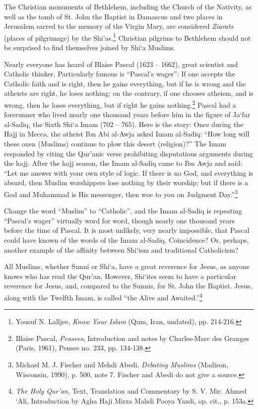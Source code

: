 The Christian monuments of Bethlehem, including the Church of the Nativity, as well as the tomb of St. John the Baptist in Damascus and two places in Jerusalem sacred to the memory of the Virgin Mary, are considered \emph{Ziarats} (places of pilgrimage) by the Shi'as.\footnote{Yousuf N. Lalljee, \emph{Know Your Islam} (Qum, Iran, undated), pp. 214-216.} Christian pilgrims to Bethlehem should not be surprised to find themselves joined by Shi`a Muslims.

Nearly everyone has heard of Blaise Pascal (1623 -- 1662), great scientist and Catholic thinker. Particularly famous is ``Pascal's wager'': If one accepts the Catholic faith and is right, then he gains everything, but if he is wrong and the atheists are right, he loses nothing; on the contrary, if one chooses atheism, and is wrong, then he loses everything, but if right he gains nothing.\footnote{Blaise Pascal, \emph{Pensees}, Introduction and notes by Charles-Marc des Granges (Paris, 1961), Pensee no. 233, pp. 134-138.} Pascal had a forerunner who lived nearly one thousand years before him in the figure of Ja`far al-Sadiq, the Sixth Shi`a Imam (702 -- 765). Here is the story: Once during the Hajj in Mecca, the atheist Ibn Abi al-Awja asked Imam al-Sadiq: ``How long will these oxen (Muslims) continue to plow this desert (religion)?'' The Imam responded by citing the Qur'anic verse prohibiting disputatious arguments during the hajj. After the hajj season, the Imam al-Sadiq came to Ibn Awja and said: ``Let me answer with your own style of logic. If there is no God, and everything is absurd, then Muslim worshippers lose nothing by their worship; but if there is a God and Muhammad is His messenger, then woe to you on Judgment Day.''\footnote{Michael M. J. Fischer and Mehdi Abedi, \emph{Debating Muslims} (Madison, Wisconsin, 1990), p. 500, note 7. Fischer and Abedi do not give a source.}

Change the word ``Muslim'' to ``Catholic'', and the Imam al-Sadiq is repeating ``Pascal's wager'' virtually word for word, though nearly one thousand years before the time of Pascal. It is most unlikely, very nearly impossible, that Pascal could have known of the words of the Imam al-Sadiq. Coincidence? Or, perhaps, another example of the affinity between Shi`ism and traditional Catholicism?

All Muslims, whether Sunni or Shi`a, have a great reverence for Jesus, as anyone knows who has read the Qur'an. However, Shi`ites seem to have a particular reverence for Jesus, and, compared to the Sunnis, for St. John the Baptist. Jesus, along with the Twelfth Imam, is called ``the Alive and Awaited.''\footnote{\emph{The Holy Qur'an}, Text, Translation and Commentary by S. V. Mir. Ahmed `Ali, Introduction by Agha Haji Mirza Mahdi Pooya Yazdi, op. cit., p. 153a.}

